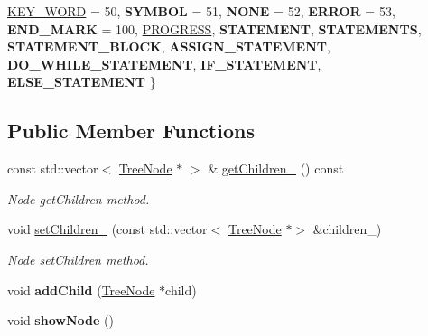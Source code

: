 \begin{DoxyCompactItemize}
\hyperlink{class_tree_node_a62f65fbb26a3d18a773f8e7f201303b3aefb73e7c0ba3285bb50361872831df9e}{K\+E\+Y\+\_\+\+W\+O\+RD} = 50, 
{\bfseries S\+Y\+M\+B\+OL} = 51, 
\newline
{\bfseries N\+O\+NE} = 52, 
{\bfseries E\+R\+R\+OR} = 53, 
{\bfseries E\+N\+D\+\_\+\+M\+A\+RK} = 100, 
\hyperlink{class_tree_node_a62f65fbb26a3d18a773f8e7f201303b3acbe0968aaa30775f92a934bdf318dcf9}{P\+R\+O\+G\+R\+E\+SS}, 
\newline
{\bfseries S\+T\+A\+T\+E\+M\+E\+NT}, 
{\bfseries S\+T\+A\+T\+E\+M\+E\+N\+TS}, 
{\bfseries S\+T\+A\+T\+E\+M\+E\+N\+T\+\_\+\+B\+L\+O\+CK}, 
{\bfseries A\+S\+S\+I\+G\+N\+\_\+\+S\+T\+A\+T\+E\+M\+E\+NT}, 
\newline
{\bfseries D\+O\+\_\+\+W\+H\+I\+L\+E\+\_\+\+S\+T\+A\+T\+E\+M\+E\+NT}, 
{\bfseries I\+F\+\_\+\+S\+T\+A\+T\+E\+M\+E\+NT}, 
{\bfseries E\+L\+S\+E\+\_\+\+S\+T\+A\+T\+E\+M\+E\+NT}
 \}
\end{DoxyCompactItemize}
\subsection*{Public Member Functions}
\begin{DoxyCompactItemize}
\item 
const std\+::vector$<$ \hyperlink{class_tree_node}{Tree\+Node} $\ast$ $>$ \& \hyperlink{class_tree_node_a8baa49dd046d1365dc85c85f12beda79}{get\+Children\+\_\+} () const
\begin{DoxyCompactList}\small\item\em Node get\+Children method. \end{DoxyCompactList}\item 
\hypertarget{class_tree_node_aeff1bea5b97d0127d21c3e852aaff74e}{}\label{class_tree_node_aeff1bea5b97d0127d21c3e852aaff74e} 
void \hyperlink{class_tree_node_aeff1bea5b97d0127d21c3e852aaff74e}{set\+Children\+\_\+} (const std\+::vector$<$ \hyperlink{class_tree_node}{Tree\+Node} $\ast$$>$ \&children\+\_\+)
\begin{DoxyCompactList}\small\item\em Node set\+Children method. \end{DoxyCompactList}\item 
\hypertarget{class_tree_node_a6b1c9937781afd0acae55b610a5c327c}{}\label{class_tree_node_a6b1c9937781afd0acae55b610a5c327c} 
void {\bfseries add\+Child} (\hyperlink{class_tree_node}{Tree\+Node} $\ast$child)
\item 
\hypertarget{class_tree_node_aa8d8232a5c5d23bcfb9ee9ff2515eaad}{}\label{class_tree_node_aa8d8232a5c5d23bcfb9ee9ff2515eaad} 
void {\bfseries show\+Node} ()
\end{DoxyCompactItemize}
